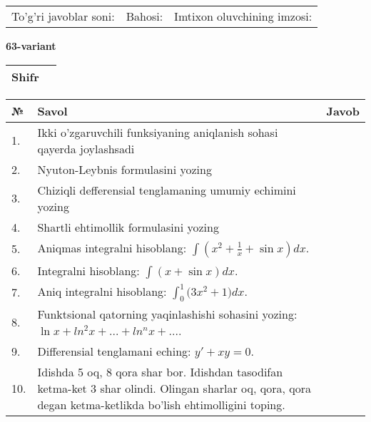 \documentclass{article}
\begin{document}
  \vspace{1cm}
  
  \begin{tabular}{lll}
  To'g'ri javoblar soni: \underline{\hspace{1.5cm}} & 
  Bahosi: \underline{\hspace{1.5cm}} & 
  Imtixon oluvchining imzosi: \underline{\hspace{2cm}} \\
  \end{tabular}
  
  \egroup
  
  \newpage
  
  
  \textbf{63-variant}\\
  
  \bgroup
  \def\arraystretch{1.6} %
  
  \begin{tabular}{|m{5.7cm}|m{9.5cm}|}
  \hline
  Shifr & \\
  \hline
  \end{tabular}
  
  \vspace{1cm}
  
  \begin{tabular}{|m{0.7cm}|m{10cm}|m{4cm}|}
  \hline
  № & Savol & Javob \\
  \hline
  1. & Ikki o'zgaruvchili funksiyaning aniqlanish sohasi qayerda joylashsadi &  \\
  \hline
  2. & Nyuton-Leybnis formulasini yozing &  \\
  \hline
  3. & Chiziqli defferensial tenglamaning umumiy echimini yozing &  \\
  \hline
  4. & Shartli ehtimollik formulasini yozing &  \\
  \hline
  5. & Aniqmas integralni hisoblang: \(\int {\left( x^{2} + \frac{1}{x} + \sin x \right)dx}\). &  \\
  \hline
  6. & Integralni hisoblang: \(\int {(x + \sin x)dx}\). &  \\
  \hline
  7. & Aniq integralni hisoblang: \(\int_{0}^{1}{(3x^{2}} + 1)dx\). &  \\
  \hline
  8. & Funktsional qatorning yaqinlashishi sohasini yozing: \(\ln x + ln^{2}x + ... + ln^{n}x + ...\). &  \\
  \hline
  9. & Differensial tenglamani eching: \(y' + xy = 0\). &  \\
  \hline
  10. & Idishda 5 oq, 8 qora shar bor. Idishdan tasodifan ketma-ket 3 shar olindi. Olingan sharlar oq, qora, qora degan ketma-ketlikda bo'lish ehtimolligini toping. &  \\
  \hline
  \end{tabular}
  
\end{document}
